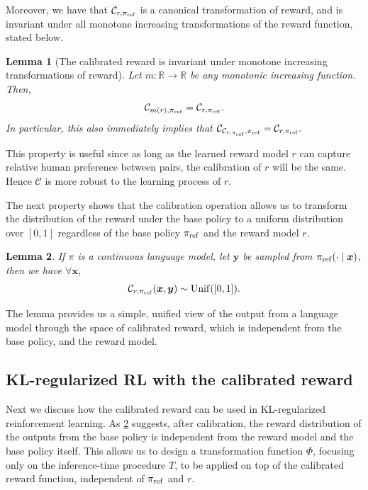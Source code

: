 \documentclass{article}
\newcommand{\by}{{\bm{y}}}
\newcommand{\bx}{{\bm{x}}}
\newcommand{\bp}{{\pi_{\rm ref}}} %
\newcommand{\car}{\mathcal{C}} %
\newtheorem{lemma}{Lemma}
\begin{document}
%

Moreover, we have that $\car_{r, \bp}$ is a canonical transformation of reward, and is invariant under all monotone increasing transformations of the reward function, stated below.
\begin{lemma}[The calibrated reward is invariant under monotone increasing transformations of reward]
Let $m: \mathbb{R} \to \mathbb{R}$ be any monotonic increasing function. Then,
\begin{equation}
    \car_{m(r), \bp} = \car_{r, \bp}.
\end{equation}
In particular, this also immediately implies that $\car_{\car_{r, \bp}, \bp} = \car_{r, \bp}.$
\label{lem:canonical}
\end{lemma}
This property is useful since as long as the learned reward model $r$ can capture relative human preference between pairs, the calibration of $r$ will be the same. Hence $\car$ is more robust to the learning process of $r$.

The next property shows that the calibration operation allows us to transform the distribution of the reward under the base policy to a uniform distribution over $[0, 1]$ regardless of the base policy $\bp$ and the reward model $r$.
\begin{lemma} \label{lem:reward_uniform}
If $\pi$ is a continuous language model, let $\by$ be sampled from $\bp(\cdot \mid \bx)$, then we have $\forall \bx$,
\[
    \car_{r, \bp}(\bx, \by) \sim {\rm Unif}([0, 1]).
\]
%
%
%
%
\end{lemma}

The lemma provides us a simple, unified view of the output from a language model through the space of calibrated reward, which is independent from the base policy, and the reward model.%
%
%
%
%
%

%
\subsection{KL-regularized RL with the calibrated reward}  \label{sec:kl_rl_calibration}

Next we discuss how the calibrated reward can be used in KL-regularized reinforcement learning. As \cref{lem:reward_uniform} suggests, after calibration, the reward distribution of the outputs from the base policy is independent from the reward model and the base policy itself. This allows us to design a transformation function  $\Phi$, focusing only on the inference-time procedure $T$, 
to be applied on top of the calibrated reward function, independent of $\bp$ and $r$. %
\end{document}
